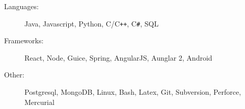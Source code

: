 

\begin{description}
  \item[Languages:]
    \hspace{.4em} 
    Java, Javascript, Python, C/C{}\verb!++!, C{}\verb!#!, SQL
  \item[Frameworks:]  
    React, Node, Guice, Spring, AngularJS, Aunglar 2, Android
  \item[Other:]
    \hspace{2.9 em} 
    Postgresql, MongoDB, Linux, Bash, Latex, Git, Subversion, Perforce, Mercurial
\end{description}
